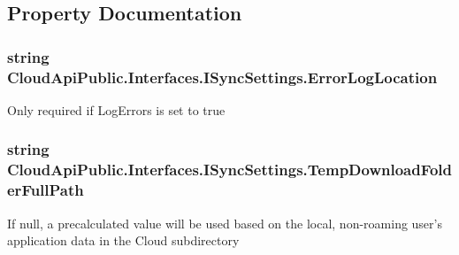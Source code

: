 \subsection{Property Documentation}
\hypertarget{interface_cloud_api_public_1_1_interfaces_1_1_i_sync_settings_af257eef28e7ac35ee0aff935e74b0236}{
\subsubsection[{Error\-Log\-Location}]{\setlength{\rightskip}{0pt plus 5cm}string Cloud\-Api\-Public.\-Interfaces.\-I\-Sync\-Settings.\-Error\-Log\-Location\hspace{0.3cm}{\ttfamily [get]}}}\label{interface_cloud_api_public_1_1_interfaces_1_1_i_sync_settings_af257eef28e7ac35ee0aff935e74b0236}


Only required if Log\-Errors is set to true 

\hypertarget{interface_cloud_api_public_1_1_interfaces_1_1_i_sync_settings_aeb43d43ce6edd995f17fc9bb9b303f8a}{
\subsubsection[{Temp\-Download\-Folder\-Full\-Path}]{\setlength{\rightskip}{0pt plus 5cm}string Cloud\-Api\-Public.\-Interfaces.\-I\-Sync\-Settings.\-Temp\-Download\-Folder\-Full\-Path\hspace{0.3cm}{\ttfamily [get]}}}\label{interface_cloud_api_public_1_1_interfaces_1_1_i_sync_settings_aeb43d43ce6edd995f17fc9bb9b303f8a}


If null, a precalculated value will be used based on the local, non-\/roaming user's application data in the Cloud subdirectory 

